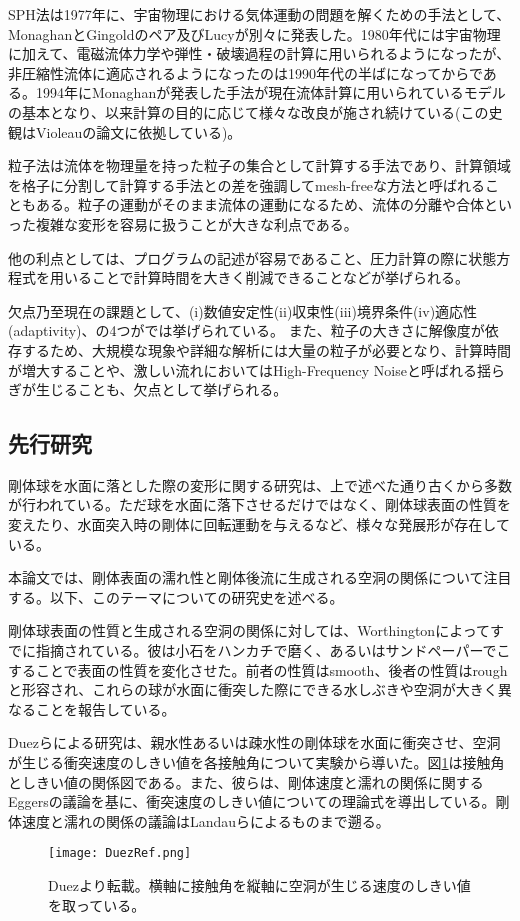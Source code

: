 \documentclass[]{jsarticle}
\begin{document}
SPH法は1977年に、宇宙物理における気体運動の問題を解くための手法として、MonaghanとGingoldのペア\cite{Gingold1977}及びLucy\cite{Lucy1977}が別々に発表した。1980年代には宇宙物理に加えて、電磁流体力学や弾性・破壊過程の計算に用いられるようになったが、非圧縮性流体に適応されるようになったのは1990年代の半ばになってからである。1994年にMonaghan\cite{Monaghan1994}が発表した手法が現在流体計算に用いられているモデルの基本となり、以来計算の目的に応じて様々な改良が施され続けている(この史観はVioleau\cite{Violeau2016}の論文に依拠している)。

粒子法は流体を物理量を持った粒子の集合として計算する手法であり、計算領域を格子に分割して計算する手法との差を強調してmesh-freeな方法と呼ばれることもある。粒子の運動がそのまま流体の運動になるため、流体の分離や合体といった複雑な変形を容易に扱うことが大きな利点である。

他の利点としては、プログラムの記述が容易であること、圧力計算の際に状態方程式を用いることで計算時間を大きく削減できることなどが挙げられる。

欠点乃至現在の課題として、(i)数値安定性(ii)収束性(iii)境界条件(iv)適応性(adaptivity)、の4つが\cite{Violeau2016}では挙げられている。
また、粒子の大きさに解像度が依存するため、大規模な現象や詳細な解析には大量の粒子が必要となり、計算時間が増大することや、激しい流れにおいてはHigh-Frequency Noiseと呼ばれる揺らぎが生じることも、欠点として挙げられる。

\subsection{先行研究}
剛体球を水面に落とした際の変形に関する研究は、上で述べた通り古くから多数が行われている。ただ球を水面に落下させるだけではなく、剛体球表面の性質を変えたり、水面突入時の剛体に回転運動を与えるなど、様々な発展形が存在している。

本論文では、剛体表面の濡れ性と剛体後流に生成される空洞の関係について注目する。以下、このテーマについての研究史を述べる。

剛体球表面の性質と生成される空洞の関係に対しては、Worthingtonによってすでに指摘されている\cite{Worthington1908}。彼は小石をハンカチで磨く、あるいはサンドペーパーでこすることで表面の性質を変化させた。前者の性質はsmooth、後者の性質はroughと形容され、これらの球が水面に衝突した際にできる水しぶきや空洞が大きく異なることを報告している。

Duez\cite{Duez2007}らによる研究は、親水性あるいは疎水性の剛体球を水面に衝突させ、空洞が生じる衝突速度のしきい値を各接触角について実験から導いた。図\ref{fig:DuezRef}は接触角としきい値の関係図である。また、彼らは、剛体速度と濡れの関係に関するEggers\cite{Eggers2004}の議論を基に、衝突速度のしきい値についての理論式を導出している。剛体速度と濡れの関係の議論はLandau\cite{landau1942}らによるものまで遡る。
\begin{figure}[H]
  \centering
  \texttt{[image: DuezRef.png]}
  \caption{Duez\cite{Duez2007}より転載。横軸に接触角を縦軸に空洞が生じる速度のしきい値を取っている。\label{fig:DuezRef} }
\end{figure}
\end{document}
